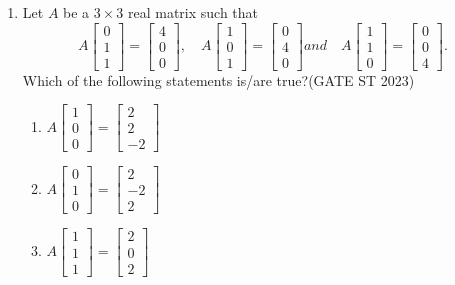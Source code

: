 \documentclass[journal]{IEEEtran}
\begin{document}
\begin{enumerate}[label=\textbf{Q.\arabic*.}, start=1, align=left, itemsep=2em]
\begin{enumerate}[label=\textbf{Q.\arabic*.}, start=11, align=left, itemsep=2em]
\item Let $A$ be a $3\times 3$ real matrix such that\[
A\begin{bmatrix}0\\1\\1\end{bmatrix} = \begin{bmatrix}4\\0\\0\end{bmatrix},\quad
A\begin{bmatrix}1\\0\\1\end{bmatrix} = \begin{bmatrix}0\\4\\0\end{bmatrix}and\quad
A\begin{bmatrix}1\\1\\0\end{bmatrix} = \begin{bmatrix}0\\0\\4\end{bmatrix}.
\]
Which of the following statements is/are true?\hfill(GATE ST 2023)
\begin{enumerate}[label=(\Alph*)]
\item $A\begin{bmatrix}1\\0\\0\end{bmatrix} = \begin{bmatrix}2\\2\\-2\end{bmatrix}$
\item $A\begin{bmatrix}0\\1\\0\end{bmatrix} = \begin{bmatrix}2\\-2\\2\end{bmatrix}$
\item $A\begin{bmatrix}1\\1\\1\end{bmatrix} = \begin{bmatrix}2\\0\\2\end{bmatrix}$

\end{enumerate}
\end{enumerate}
\end{enumerate}
\end{document}
